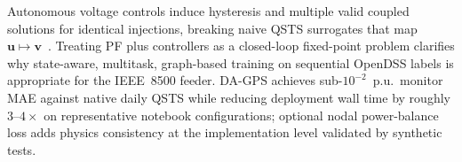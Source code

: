 \documentclass[11pt,a4paper]{article}
\begin{document}
Autonomous voltage controls induce hysteresis and multiple valid coupled solutions
for identical injections, breaking naive QSTS surrogates that map
$\mathbf{u}\mapsto\mathbf{v}$~\cite{deboever2017qsts}.  Treating PF plus
controllers as a closed-loop fixed-point problem clarifies why state-aware,
multitask, graph-based training on sequential OpenDSS labels is appropriate for
the IEEE~8500 feeder.  DA-GPS achieves sub-$10^{-2}$~p.u.\ monitor MAE against
native daily QSTS while reducing deployment wall time by roughly $3$--$4\times$
on representative notebook configurations; optional nodal power-balance loss adds
physics consistency at the implementation level validated by synthetic tests.



\end{document}
